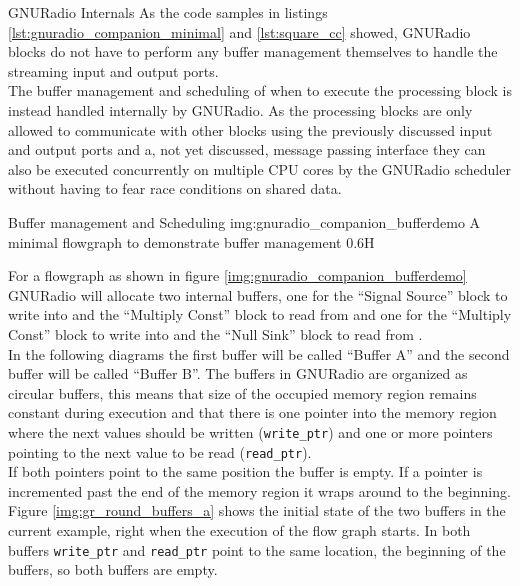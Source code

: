 
\begin{subchapter}{GNURadio Internals}
  As the code samples in listings \ref{lst:gnuradio_companion_minimal}
  and \ref{lst:square_cc} showed, GNURadio blocks do not have to
  perform any buffer management themselves to handle the streaming
  input and output ports. \\

  The buffer management and scheduling of when to execute the processing
  block is instead handled internally by GNURadio.
  As the processing blocks are only allowed to communicate with
  other blocks using the previously discussed input and output ports
  and a, not yet discussed, message passing interface they can also
  be executed concurrently on multiple CPU cores by the GNURadio scheduler
  without having to fear race conditions on shared data. \\

  \begin{subsubchapter}{Buffer management and Scheduling}
                    {img:gnuradio_companion_bufferdemo}
                    {A minimal flowgraph to demonstrate buffer management}
                    {0.6}{H}

    For a flowgraph as shown in figure \ref{img:gnuradio_companion_bufferdemo}
    GNURadio will allocate two internal buffers, one for the ``Signal Source'' block
    to write into and the ``Multiply Const'' block to read from and one for the
    ``Multiply Const'' block to write into and the ``Null Sink'' block to
    read from \cite{grblogbuffers}. \\

    In the following diagrams the first buffer will be called ``Buffer A''
    and the second buffer will be called ``Buffer B''.
    The buffers in GNURadio are organized as circular buffers, this means
    that size of the occupied memory region remains constant during execution
    and that there is one pointer into the memory region where the next
    values should be written (\texttt{write\_ptr}) and one or more
    pointers pointing to the next value to be read (\texttt{read\_ptr}). \\

    If both pointers point to the same position the buffer is empty.
    If a pointer is incremented past the end of the memory region
    it wraps around to the beginning. \\

    Figure \ref{img:gr_round_buffers_a} shows the initial state of the
    two buffers in the current example, right when the execution of the
    flow graph starts.
    In both buffers \texttt{write\_ptr} and \texttt{read\_ptr}
    point to the same location, the beginning of the buffers,
    so both buffers are empty.


\end{subsubchapter}
\end{subchapter}
